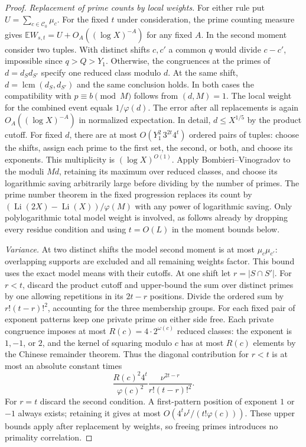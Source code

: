 \documentclass[a4paper,11pt]{article}
\begin{document}
\begin{proof}
\emph{Replacement of prime counts by local weights.}
For either rule put $U=\sum_{c\in\mathcal C_0}\mu_c$. For the fixed
$t$ under consideration, the prime counting measure gives
$\mathbb E W_{s,t}=U+O_A((\log X)^{-A})$ for any fixed $A$.
In the second moment consider two tuples. With distinct shifts $c,c'$
a common $q$ would divide $c-c'$, impossible since $q>Q>Y_1$.
Otherwise, the congruences at the primes of $d=d_Sd_{S'}$ specify
one reduced class modulo $d$. At the same shift,
$d=\operatorname{lcm}(d_S,d_{S'})$ and the same conclusion holds.
In both cases the compatibility with $p\equiv b\pmod M$ follows from
$(d,M)=1$. The local weight for the combined event equals
$1/\varphi(d)$. The error after all replacements is again
$O_A((\log X)^{-A})$ in normalized expectation. In detail,
$d\le X^{1/5}$ by the product cutoff. For fixed $d$, there are
at most $O(Y_1^2\,3^{2t}4^t)$ ordered pairs of tuples: choose
the shifts, assign each prime to the first set, the second, or both,
and choose its exponents. This multiplicity is $(\log X)^{O(1)}$.
Apply Bombieri--Vinogradov to the moduli $Md$, retaining its maximum
over reduced classes, and choose its logarithmic saving arbitrarily
large before dividing by the number of primes. The prime number
theorem in the fixed progression replaces its count by
$(\operatorname{Li}(2X)-\operatorname{Li}(X))/\varphi(M)$ with any
power of logarithmic saving. Only polylogarithmic total model weight
is involved, as follows already by dropping every residue condition
and using $t=O(L)$ in the moment bounds below.

\emph{Variance.}
At two distinct shifts the model second moment is at most
$\mu_c\mu_{c'}$: overlapping supports are excluded and all remaining
weights factor. This bound uses the exact model means with their
cutoffs. At one shift let $r=|S\cap S'|$. For $r<t$, discard the
product cutoff and upper-bound the sum over distinct primes by one
allowing repetitions in its $2t-r$ positions. Divide the ordered
sum by $r!(t-r)!^2$, accounting for the three membership groups.
For each fixed pair of exponent patterns keep one private prime
on either side free. Each private congruence imposes at most
$R(c)=4\cdot2^{\omega(c)}$ reduced classes: the exponent is $1,-1$,
or $2$, and the kernel of squaring modulo $c$ has at most $R(c)$
elements by the Chinese remainder theorem. Thus the diagonal
contribution for $r<t$ is at most an absolute constant times
\[
 \frac{R(c)^2 4^t}{\varphi(c)^2}
 \frac{\nu^{2t-r}}{r!(t-r)!^2}.
\]
For $r=t$ discard the second condition. A first-pattern position of
exponent $1$ or $-1$ always exists; retaining it gives at most
$O(4^t\nu^t/(t!\varphi(c)))$. These upper bounds apply after
replacement by weights, so freeing primes introduces no primality
correlation.


\end{proof}
\end{document}
